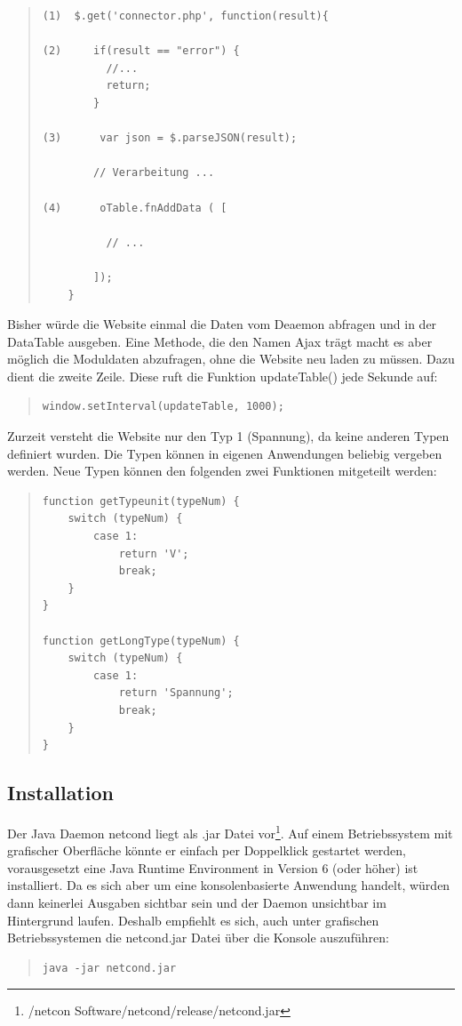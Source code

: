 \documentclass[a4paper,14pt,headsepline]{scrartcl}
\begin{document}
\begin{quote}
\begin{verbatim}
(1)  $.get('connector.php', function(result){

(2)     if(result == "error") { 
          //...
          return;
        }
    
(3)      var json = $.parseJSON(result);
    
        // Verarbeitung ...
    
(4)      oTable.fnAddData ( [
    
          // ... 
                
        ]);
    }
\end{verbatim}
\end{quote}  
Bisher würde die Website einmal die Daten vom Deaemon abfragen und in der DataTable ausgeben. Eine Methode, die den Namen Ajax trägt macht es aber möglich die Moduldaten abzufragen, ohne die Website neu laden zu müssen. Dazu dient die zweite Zeile. Diese ruft die Funktion updateTable() jede Sekunde auf:

\begin{quote}
\begin{verbatim}
window.setInterval(updateTable, 1000);
\end{verbatim}
\end{quote}  

Zurzeit versteht die Website nur den Typ 1 (Spannung), da keine anderen Typen definiert wurden. Die Typen können in eigenen Anwendungen beliebig vergeben werden. Neue Typen können den folgenden zwei Funktionen mitgeteilt werden: 

\begin{quote}
\begin{verbatim}
function getTypeunit(typeNum) {
    switch (typeNum) {
        case 1:
            return 'V';
            break;
    }
}

function getLongType(typeNum) {
    switch (typeNum) {
        case 1:
            return 'Spannung';
            break;
    }
}
\end{verbatim}
\end{quote}  
 
\newpage

\subsection{Installation}

Der Java Daemon netcond liegt als .jar Datei vor\footnote{/netcon Software/netcond/release/netcond.jar}. Auf einem Betriebssystem mit grafischer Oberfläche könnte er einfach per Doppelklick gestartet werden, vorausgesetzt eine Java Runtime Environment in Version 6 (oder höher) ist installiert. Da es sich aber um eine konsolenbasierte Anwendung handelt, würden dann keinerlei Ausgaben sichtbar sein und der Daemon unsichtbar im Hintergrund laufen. Deshalb empfiehlt es sich, auch unter grafischen Betriebssystemen die netcond.jar Datei über die Konsole auszuführen:
\begin{quote}
\begin{verbatim}
java -jar netcond.jar
\end{verbatim}
\end{quote}
\end{document}
